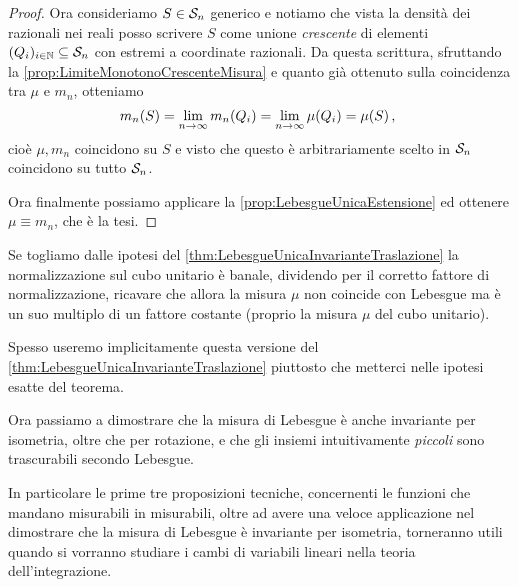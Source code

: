 \begin{proof}
	Ora consideriamo $S\in\S_n$ generico e notiamo che vista la densità dei razionali nei reali posso scrivere $S$ come unione \emph{crescente} di elementi $(Q_i)_{i\in\N}\subseteq \S_n$ con estremi a coordinate razionali. 
	Da questa scrittura, sfruttando la \cref{prop:LimiteMonotonoCrescenteMisura} e quanto già ottenuto sulla coincidenza tra $\mu$ e $m_n$, otteniamo
	\begin{equation*}
		m_n(S)=\lim_{n\to\infty}m_n(Q_i)=\lim_{n\to\infty}\mu(Q_i)=\mu(S) \virgola
	\end{equation*}
	cioè $\mu,m_n$ coincidono su $S$ e visto che questo è arbitrariamente scelto in $\S_n$ coincidono su tutto $\S_n$.
	
	Ora finalmente possiamo applicare la \cref{prop:LebesgueUnicaEstensione} ed ottenere $\mu\equiv m_n$, che è la tesi.
\end{proof}
\begin{remark}
	Se togliamo dalle ipotesi del \cref{thm:LebesgueUnicaInvarianteTraslazione} la normalizzazione sul cubo unitario è banale, dividendo per il corretto fattore di normalizzazione, ricavare che allora la misura $\mu$ non coincide con Lebesgue ma è un suo multiplo di un fattore costante (proprio la misura $\mu$ del cubo unitario).
	
	Spesso useremo implicitamente questa versione del \cref{thm:LebesgueUnicaInvarianteTraslazione} piuttosto che metterci nelle ipotesi esatte del teorema.
\end{remark}



Ora passiamo a dimostrare che la misura di Lebesgue è anche invariante per isometria, oltre che per rotazione, e che gli insiemi intuitivamente \emph{piccoli} sono trascurabili secondo Lebesgue.

In particolare le prime tre proposizioni tecniche, concernenti le funzioni che mandano misurabili in misurabili, oltre ad avere una veloce applicazione nel dimostrare che la misura di Lebesgue è invariante per isometria, torneranno utili quando si vorranno studiare i cambi di variabili lineari nella teoria dell'integrazione.

